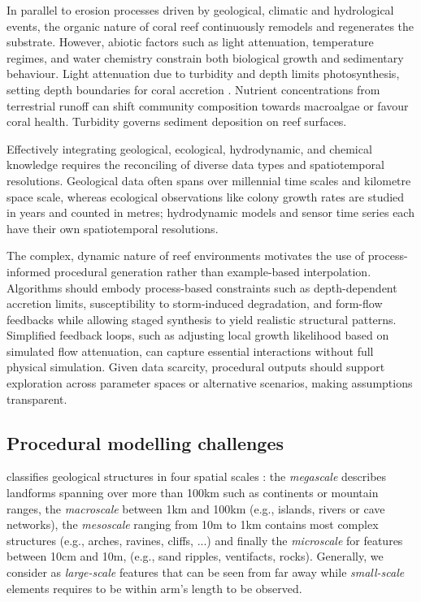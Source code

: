 In parallel to erosion processes driven by geological, climatic and hydrological events, the organic nature of coral reef continuously remodels and regenerates the substrate. However, abiotic factors such as light attenuation, temperature regimes, and water chemistry constrain both biological growth and sedimentary behaviour. Light attenuation due to turbidity and depth limits photosynthesis, setting depth boundaries for coral accretion \cite{Kirk1994}. Nutrient concentrations from terrestrial runoff can shift community composition towards macroalgae or favour coral health. Turbidity governs sediment deposition on reef surfaces.

Effectively integrating geological, ecological, hydrodynamic, and chemical knowledge requires the reconciling of diverse data types and spatiotemporal resolutions. Geological data often spans over millennial time scales and kilometre space scale, whereas ecological observations like colony growth rates are studied in years and counted in metres; hydrodynamic models and sensor time series each have their own spatiotemporal resolutions.

The complex, dynamic nature of reef environments motivates the use of process-informed procedural generation rather than example-based interpolation. Algorithms should embody process-based constraints such as depth-dependent accretion limits, susceptibility to storm-induced degradation, and form-flow feedbacks while allowing staged synthesis to yield realistic structural patterns. Simplified feedback loops, such as adjusting local growth likelihood based on simulated flow attenuation, can capture essential interactions without full physical simulation. Given data scarcity, procedural outputs should support exploration across parameter spaces or alternative scenarios, making assumptions transparent.

\subsection{Procedural modelling challenges}
 classifies geological structures in four spatial scales \cite{ParisThesis}: the \emph{megascale} describes landforms spanning over more than 100km such as continents or mountain ranges, the \emph{macroscale} between 1km and 100km (e.g., islands, rivers or cave networks), the \emph{mesoscale} ranging from 10m to 1km contains most complex structures (e.g., arches, ravines, cliffs, ...) and finally the \emph{microscale} for features between 10cm and 10m, (e.g., sand ripples, ventifacts, rocks). Generally, we consider as \emph{large-scale} features that can be seen from far away while \emph{small-scale} elements requires to be within arm's length to be observed.

